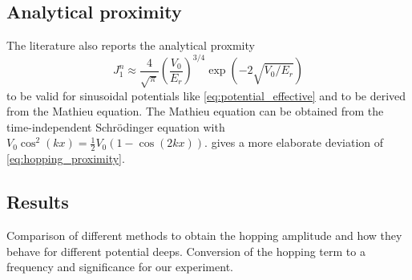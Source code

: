 \subsection{Analytical proximity}

The literature \cite{Bloch2008} also reports the analytical proxmity
\begin{equation}
  J^n_1\approx
  \frac{4}{\sqrt{\pi}}\left(\frac{V_0}{E_r}\right)^{3/4}\exp(-2\sqrt{V_0/E_r})
  \label{eq:hopping_proximity}
\end{equation}
to be valid for sinusoidal potentials like \cref{eq:potential_effective} and
to be derived from the Mathieu equation. The Mathieu equation can be obtained
from the time-independent Schrödinger equation with
$V_0\cos^2(kx)=\frac{1}{2}V_0\left(1-\cos(2kx)\right)$. \cite{Connor1984}
gives a more elaborate deviation of \cref{eq:hopping_proximity}.

\subsection{Results}

Comparison of different methods to obtain the hopping amplitude and how
they behave for different potential deeps. Conversion of the hopping term to
a frequency and significance for our experiment.
